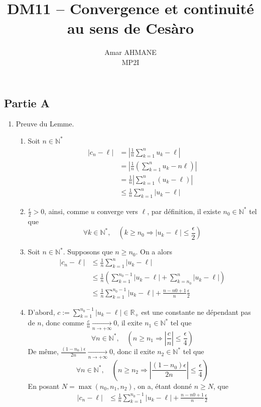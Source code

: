 \documentclass[17pt]{article}
\title{DM11 – Convergence et continuité au sens de Cesàro}
\author{Amar AHMANE\\ MP2I}
\def\N{\mathbb N}
\def\R{\mathbb R}
\def\implique{\Longrightarrow}
\begin{document}
	\maketitle
	
	\subsection*{Partie A}
	\begin{enumerate}
		\item Preuve du Lemme.
		\begin{enumerate}
			\item Soit $n\in\N^*$
			\begin{align*}
				|c_n-\ell|  &= \left|\frac1n\sum_{k=1}^nu_k-\ell\right|\\
							&= \left|\frac1n\left(\sum_{k=1}^nu_k-n\ell\right)\right|\\
							&= \frac1n\left|\sum_{k=1}^n(u_k-\ell)\right|\\
							&\leq \frac1n\sum_{k=1}^n|u_k-\ell|
			\end{align*}
			\item $\frac\epsilon2>0$, ainsi, comme $u$ converge vers $\ell$, par définition, il existe $n_0\in\N^*$ tel que \[\forall k\in\N^*,\quad \left(k\geq n_0\implique |u_k-\ell|\leq \frac\epsilon2\right)\]
			\item Soit $n\in\N^*$. Supposons que $n\geq n_0$. On a alors 
			\begin{align*}
				|c_n-\ell|  &\leq \frac1n\sum_{k=1}^n|u_k-\ell|\\
							&\leq \frac1n\left(\sum_{k=1}^{n_0-1}|u_k-\ell|+\sum_{k=n_0}^n|u_k-\ell|\right)\\
							&\leq \frac1n\sum_{k=1}^{n_0-1}|u_k-\ell|+\frac{n-n0+1}n\frac\epsilon2
			\end{align*}
			\item D'abord, $c:=\sum_{k=1}^{n_0-1}|u_k-\ell|\in\R_+$ est une constante ne dépendant pas de $n$, donc comme $\frac cn\xrightarrow[n\rightarrow +\infty ]{}0$, il exite $n_1\in\N^*$ tel que \[\forall n\in\N^*,\quad \left(n\geq n_1\implique \left|\frac cn\right|\leq \frac\epsilon4\right)\]
			De même, $\frac{(1-n_0)\epsilon}{2n}\xrightarrow[n\rightarrow +\infty ]{}0$, donc il exite $n_2\in\N^*$ tel que \[\forall n\in\N^*,\quad \left(n\geq n_2\implique \left|\frac{(1-n_0)\epsilon}{2n}\right|\leq \frac\epsilon4\right)\]
			En posant $N=\max(n_0,n_1,n_2)$, on a, étant donné $n\geq N$, que 
			\begin{align*}
				|c_n-\ell|  &\leq \frac1n\sum_{k=1}^{n_0-1}|u_k-\ell|+\frac{n-n0+1}n\frac\epsilon2\\

\end{align*}
\end{enumerate}
\end{enumerate}
\end{document}
